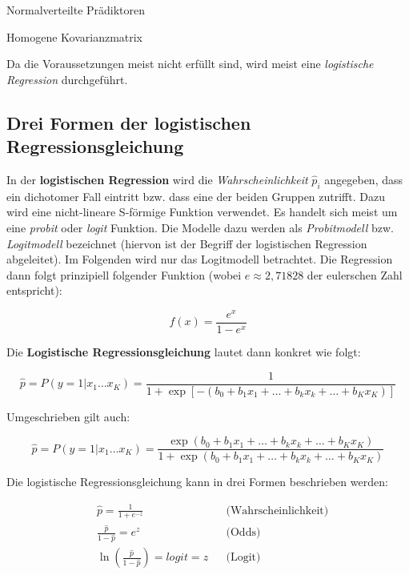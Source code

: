 \documentclass{article}
\numberwithin{equation}{section}
\begin{document}
\begin{compactitem}
\item Normalverteilte Prädiktoren
\item Homogene Kovarianzmatrix
\end{compactitem}

Da die Voraussetzungen meist nicht erfüllt sind, wird meist eine \emph{logistische Regression} durchgeführt.

\subsection{Drei Formen der logistischen Regressionsgleichung}
\label{sec:3-log-reg}

In der \textbf{logistischen Regression} wird die \emph{Wahrscheinlichkeit} $\hat p_i$ angegeben, dass ein dichotomer Fall eintritt bzw. dass eine der beiden Gruppen zutrifft. Dazu wird eine nicht-lineare S-förmige Funktion verwendet. Es handelt sich meist um eine \emph{probit} oder \emph{logit} Funktion. Die Modelle dazu werden als \emph{Probitmodell} bzw. \emph{Logitmodell} bezeichnet (hiervon ist der Begriff der logistischen Regression abgeleitet). Im Folgenden wird nur das Logitmodell betrachtet. Die Regression dann folgt prinzipiell folgender Funktion (wobei $e \approx 2,71828$ der eulerschen Zahl entspricht):

\begin{equation}
f(x) = \frac{e^x}{1-e^x}
\end{equation}

Die \textbf{Logistische Regressionsgleichung} lautet dann konkret wie folgt:

\begin{equation}
\hat p = P(y=1 | x_1 \dots x_K) = \frac{1}{1+\exp{[-(b_0 + b_1 x_1 + \dots + b_k x_k + \dots + b_K x_K)]}}
\end{equation}

Umgeschrieben gilt auch:

\begin{equation}
\label{eq:log-propability}
\hat p = P(y=1 | x_1 \dots x_K) = \frac{\exp{(b_0 + b_1 x_1 + \dots + b_k x_k + \dots + b_K x_K)}}{1+\exp{(b_0 + b_1 x_1 + \dots + b_k x_k + \dots + b_K x_K)}}
\end{equation}

Die logistische Regressionsgleichung kann in drei Formen beschrieben werden:

\begin{subequations}
\begin{align}
& \hat p = \frac{1}{1+e^{-z}} && \text{(Wahrscheinlichkeit)}\\
& \frac{\hat p}{1-\hat p} = e^z &&  \text{(Odds)}\\
& \ln \left( \frac{\hat p}{1- \hat p} \right) = logit = z && \text{(Logit)}
\end{align}
\end{subequations}
\end{document}
